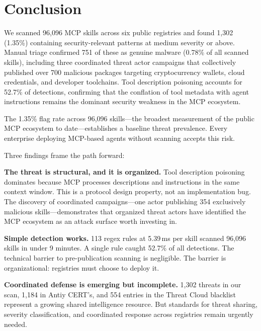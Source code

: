 \documentclass[letterpaper,twocolumn,10pt]{article}
\begin{document}
\section{Conclusion}
\label{sec:conclusion}

We scanned 96,096 MCP skills across six public registries and found
1,302 (1.35\%) containing security-relevant patterns at medium severity
or above.  Manual triage confirmed 751 of these as genuine malware
(0.78\% of all scanned skills), including three coordinated threat actor
campaigns that collectively published over 700 malicious packages
targeting cryptocurrency wallets, cloud credentials, and developer
toolchains.  Tool description poisoning accounts for 52.7\% of
detections, confirming that the conflation of tool metadata with agent
instructions remains the dominant security weakness in the MCP ecosystem.

The 1.35\% flag rate across 96,096 skills---the broadest measurement of
the public MCP ecosystem to date---establishes a baseline threat
prevalence.  Every enterprise deploying MCP-based agents without scanning
accepts this risk.

Three findings frame the path forward:

\textbf{The threat is structural, and it is organized.}  Tool description
poisoning dominates because MCP processes descriptions and instructions
in the same context window.  This is a protocol design property, not an
implementation bug.  The discovery of coordinated campaigns---one actor
publishing 354 exclusively malicious skills---demonstrates that
organized threat actors have identified the MCP ecosystem as an attack
surface worth investing in.

\textbf{Simple detection works.}  113 regex rules at 5.39\,ms per skill
scanned 96,096 skills in under 9 minutes.  A single rule caught 52.7\%
of all detections.  The technical barrier to pre-publication scanning is
negligible.  The barrier is organizational: registries must choose to
deploy it.

\textbf{Coordinated defense is emerging but incomplete.}  1,302 threats
in our scan, 1,184 in Antiy CERT's, and 554 entries in the Threat Cloud
blacklist represent a growing shared intelligence resource.  But
standards for threat sharing, severity classification, and coordinated
response across registries remain urgently needed.
\end{document}
